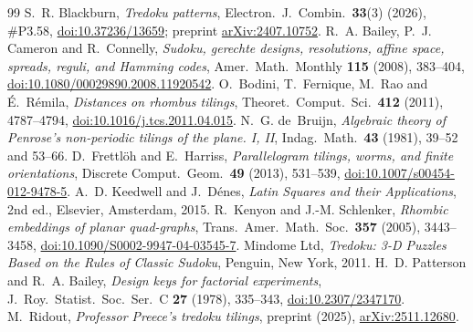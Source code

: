 \documentclass[11pt,a4paper]{amsart}
\theoremstyle{definition}
\theoremstyle{remark}
\begin{document}
\begin{thebibliography}{99}
S.~R. Blackburn, \emph{Tredoku patterns}, Electron.\ J.\ Combin.\ \textbf{33}(3) (2026), \#P3.58, \href{https://doi.org/10.37236/13659}{doi:10.37236/13659}; preprint \href{https://arxiv.org/abs/2407.10752}{arXiv:2407.10752}.
R.~A. Bailey, P.~J. Cameron and R.~Connelly, \emph{Sudoku, gerechte designs, resolutions, affine space, spreads, reguli, and Hamming codes}, Amer.\ Math.\ Monthly \textbf{115} (2008), 383--404, \href{https://doi.org/10.1080/00029890.2008.11920542}{doi:10.1080/00029890.2008.11920542}.
O.~Bodini, T.~Fernique, M.~Rao and \'E.~R\'emila, \emph{Distances on rhombus tilings}, Theoret.\ Comput.\ Sci.\ \textbf{412} (2011), 4787--4794, \href{https://doi.org/10.1016/j.tcs.2011.04.015}{doi:10.1016/j.tcs.2011.04.015}.
N.~G. de~Bruijn, \emph{Algebraic theory of Penrose's non-periodic tilings of the plane. I, II}, Indag.\ Math.\ \textbf{43} (1981), 39--52 and 53--66.
D.~Frettl\"oh and E.~Harriss, \emph{Parallelogram tilings, worms, and finite orientations}, Discrete Comput.\ Geom.\ \textbf{49} (2013), 531--539, \href{https://doi.org/10.1007/s00454-012-9478-5}{doi:10.1007/s00454-012-9478-5}.
A.~D. Keedwell and J.~D\'enes, \emph{Latin Squares and their Applications}, 2nd ed., Elsevier, Amsterdam, 2015.
R.~Kenyon and J.-M. Schlenker, \emph{Rhombic embeddings of planar quad-graphs}, Trans.\ Amer.\ Math.\ Soc.\ \textbf{357} (2005), 3443--3458, \href{https://doi.org/10.1090/S0002-9947-04-03545-7}{doi:10.1090/S0002-9947-04-03545-7}.
Mindome Ltd, \emph{Tredoku: 3-D Puzzles Based on the Rules of Classic Sudoku}, Penguin, New York, 2011.
H.~D. Patterson and R.~A. Bailey, \emph{Design keys for factorial experiments}, J.\ Roy.\ Statist.\ Soc.\ Ser.~C \textbf{27} (1978), 335--343, \href{https://doi.org/10.2307/2347170}{doi:10.2307/2347170}.
M.~Ridout, \emph{Professor Preece's tredoku tilings}, preprint (2025), \href{https://arxiv.org/abs/2511.12680}{arXiv:2511.12680}.
\end{thebibliography}
\end{document}
